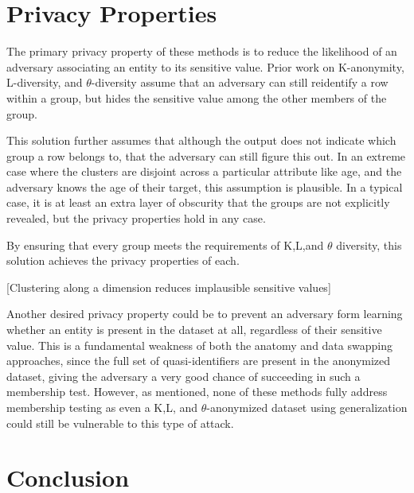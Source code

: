 \section{Privacy Properties}
The primary privacy property of these methods is to reduce the likelihood of an adversary associating an  entity to its sensitive value. Prior work on K-anonymity, L-diversity, and $\theta$-diversity assume that an adversary can still reidentify a row within a group, but hides the sensitive value among the other members of the group.

This solution further assumes that although the output does not indicate which group a row belongs to, that the adversary can still figure this out. In an extreme case where the clusters are disjoint across a particular attribute like age, and the adversary knows the age of their target, this assumption is plausible. In a typical case, it is at least an extra layer of obscurity that the groups are not explicitly revealed, but the privacy properties hold in any case.

By ensuring that every group meets the requirements of K,L,and $\theta$ diversity, this solution achieves the privacy properties of each.

[Clustering along a dimension reduces implausible sensitive values]

Another desired privacy property could be to prevent an adversary form learning whether an entity is present in the dataset at all, regardless of their sensitive value. This is a fundamental weakness of both the anatomy and data swapping approaches, since the full set of quasi-identifiers are present in the anonymized dataset, giving the adversary a very good chance of succeeding in such a membership test. However, as mentioned, none of these methods fully address membership testing as even a K,L, and $\theta$-anonymized dataset using generalization could still be vulnerable to this type of attack.

\section{Conclusion}




% 





